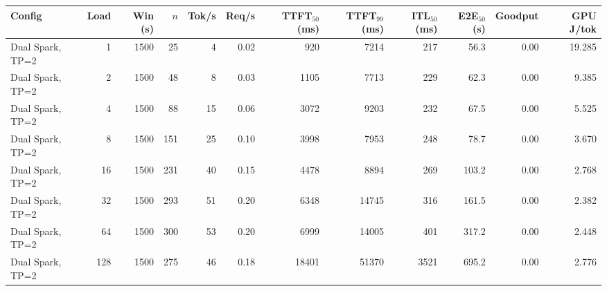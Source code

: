 \begin{tabular}{l r r r r r r r r r r r}
\toprule
Config & Load & Win (s) & $n$ & Tok/s & Req/s & TTFT$_{50}$ (ms) & TTFT$_{99}$ (ms) & ITL$_{50}$ (ms) & E2E$_{50}$ (s) & Goodput & GPU J/tok \\
\midrule
Dual Spark, TP=2 & 1 & 1500 & 25\rlap{$^\dagger$} & 4 & 0.02 & 920 & 7214 & 217 & 56.3 & 0.00 & 19.285 \\
Dual Spark, TP=2 & 2 & 1500 & 48\rlap{$^\dagger$} & 8 & 0.03 & 1105 & 7713 & 229 & 62.3 & 0.00 & 9.385 \\
Dual Spark, TP=2 & 4 & 1500 & 88\rlap{$^\dagger$} & 15 & 0.06 & 3072 & 9203 & 232 & 67.5 & 0.00 & 5.525 \\
Dual Spark, TP=2 & 8 & 1500 & 151 & 25 & 0.10 & 3998 & 7953 & 248 & 78.7 & 0.00 & 3.670 \\
Dual Spark, TP=2 & 16 & 1500 & 231 & 40 & 0.15 & 4478 & 8894 & 269 & 103.2 & 0.00 & 2.768 \\
Dual Spark, TP=2 & 32 & 1500 & 293 & 51 & 0.20 & 6348 & 14745 & 316 & 161.5 & 0.00 & 2.382 \\
Dual Spark, TP=2 & 64 & 1500 & 300 & 53 & 0.20 & 6999 & 14005 & 401 & 317.2 & 0.00 & 2.448 \\
Dual Spark, TP=2 & 128 & 1500 & 275 & 46 & 0.18 & 18401 & 51370 & 3521 & 695.2 & 0.00 & 2.776 \\
\bottomrule
\end{tabular}
